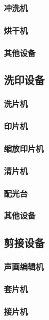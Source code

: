 \documentclass[UTF8]{../../ApplicationUniverse}
\begin{document}
        \subsubsection{冲洗机}
        \subsubsection{烘干机}
        \subsubsection{其他设备}
    \subsection{洗印设备}
        \subsubsection{洗片机}
        \subsubsection{印片机}
        \subsubsection{缩放印片机}
        \subsubsection{清片机}
        \subsubsection{配光台}
        \subsubsection{其他设备}
    \subsection{剪接设备}
        \subsubsection{声画编辑机}
        \subsubsection{套片机}
        \subsubsection{接片机}
\end{document}

